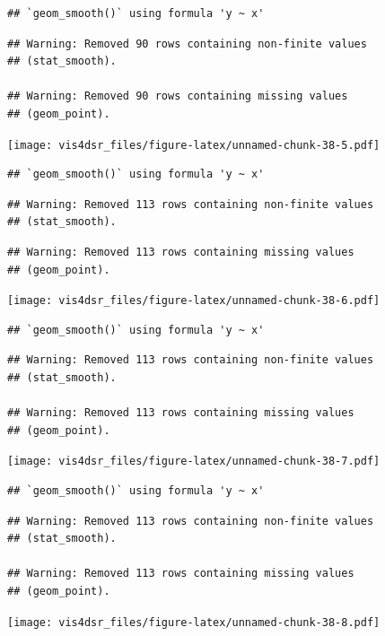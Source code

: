 \documentclass[
]{krantz}
\begin{document}
\begin{verbatim}
## `geom_smooth()` using formula 'y ~ x'
\end{verbatim}

\begin{verbatim}
## Warning: Removed 90 rows containing non-finite values
## (stat_smooth).

## Warning: Removed 90 rows containing missing values
## (geom_point).
\end{verbatim}

\texttt{[image: vis4dsr\_files/figure-latex/unnamed-chunk-38-5.pdf]}

\begin{verbatim}
## `geom_smooth()` using formula 'y ~ x'
\end{verbatim}

\begin{verbatim}
## Warning: Removed 113 rows containing non-finite values
## (stat_smooth).
\end{verbatim}

\begin{verbatim}
## Warning: Removed 113 rows containing missing values
## (geom_point).
\end{verbatim}

\texttt{[image: vis4dsr\_files/figure-latex/unnamed-chunk-38-6.pdf]}

\begin{verbatim}
## `geom_smooth()` using formula 'y ~ x'
\end{verbatim}

\begin{verbatim}
## Warning: Removed 113 rows containing non-finite values
## (stat_smooth).

## Warning: Removed 113 rows containing missing values
## (geom_point).
\end{verbatim}

\texttt{[image: vis4dsr\_files/figure-latex/unnamed-chunk-38-7.pdf]}

\begin{verbatim}
## `geom_smooth()` using formula 'y ~ x'
\end{verbatim}

\begin{verbatim}
## Warning: Removed 113 rows containing non-finite values
## (stat_smooth).

## Warning: Removed 113 rows containing missing values
## (geom_point).
\end{verbatim}

\texttt{[image: vis4dsr\_files/figure-latex/unnamed-chunk-38-8.pdf]}
\end{document}

